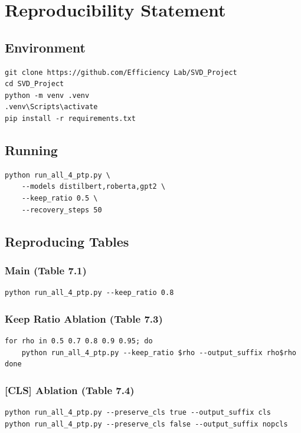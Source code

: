 
\section{Reproducibility Statement}

\subsection{Environment}

\begin{lstlisting}
git clone https://github.com/Efficiency Lab/SVD_Project
cd SVD_Project
python -m venv .venv
.venv\Scripts\activate
pip install -r requirements.txt
\end{lstlisting}

\subsection{Running}

\begin{lstlisting}
python run_all_4_ptp.py \
    --models distilbert,roberta,gpt2 \
    --keep_ratio 0.5 \
    --recovery_steps 50
\end{lstlisting}

\subsection{Reproducing Tables}

\subsubsection{Main (Table 7.1)}
\begin{lstlisting}
python run_all_4_ptp.py --keep_ratio 0.8
\end{lstlisting}

\subsubsection{Keep Ratio Ablation (Table 7.3)}
\begin{lstlisting}
for rho in 0.5 0.7 0.8 0.9 0.95; do
    python run_all_4_ptp.py --keep_ratio $rho --output_suffix rho$rho
done
\end{lstlisting}

\subsubsection{[CLS] Ablation (Table 7.4)}
\begin{lstlisting}
python run_all_4_ptp.py --preserve_cls true --output_suffix cls
python run_all_4_ptp.py --preserve_cls false --output_suffix nopcls
\end{lstlisting}

